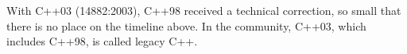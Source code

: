 

With C++03 (14882:2003), C++98 received a technical correction, so small that there is no place on the timeline above. In the community, C++03, which includes C++98, is called legacy C++.